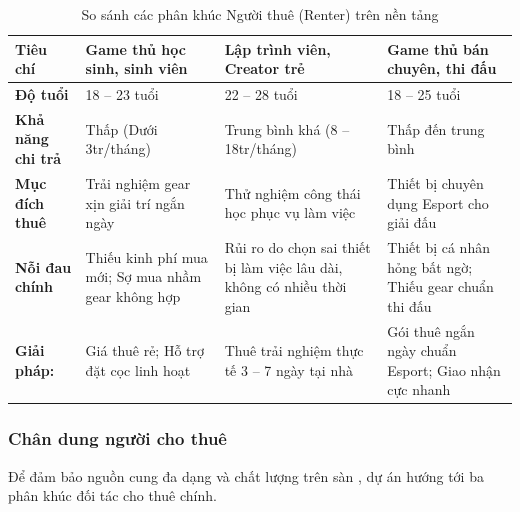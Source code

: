 \begin{table}[H]
    \centering
    \caption{So sánh các phân khúc Người thuê (Renter) trên nền tảng}
    \label{tab:renter-icp}
    \small
    \begin{tabular}{p{3.5cm}p{3.5cm}p{3.5cm}p{3.5cm}}
        \toprule
        \textbf{Tiêu chí} & \textbf{Game thủ học sinh, sinh viên} & \textbf{Lập trình viên, Creator trẻ} & \textbf{Game thủ bán chuyên, thi đấu} \\
        \midrule
        \textbf{Độ tuổi} & 18 -- 23 tuổi & 22 -- 28 tuổi & 18 -- 25 tuổi \\
        \textbf{Khả năng chi trả} & Thấp (Dưới 3tr/tháng) & Trung bình khá (8 -- 18tr/tháng) & Thấp đến trung bình \\
        \textbf{Mục đích thuê} & Trải nghiệm gear xịn giải trí ngắn ngày & Thử nghiệm công thái học phục vụ làm việc & Thiết bị chuyên dụng Esport cho giải đấu \\
        \textbf{Nỗi đau chính} & Thiếu kinh phí mua mới; Sợ mua nhầm gear không hợp & Rủi ro do chọn sai thiết bị làm việc lâu dài, không có nhiều thời gian & Thiết bị cá nhân hỏng bất ngờ; Thiếu gear chuẩn thi đấu \\
        \textbf{Giải pháp: } & Giá thuê rẻ; Hỗ trợ đặt cọc linh hoạt & Thuê trải nghiệm thực tế 3 -- 7 ngày tại nhà & Gói thuê ngắn ngày chuẩn Esport; Giao nhận cực nhanh \\
        \bottomrule
    \end{tabular}
\end{table}

\subsubsection{Chân dung người cho thuê}

Để đảm bảo nguồn cung đa dạng và chất lượng trên sàn \projectname{}, dự án hướng tới ba phân khúc đối tác cho thuê chính.

